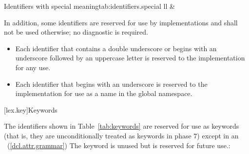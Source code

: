 \begin{floattable}{Identifiers with special meaning}{tab:identifiers.special}
{ll}
\topline
{}        &
           \\
\end{floattable}

\pnum
{}%
%
%
In addition, some identifiers are reserved for use by \Cpp
implementations and shall
not be used otherwise; no diagnostic is required.%
\begin{itemize}
\item
Each identifier that contains a double underscore
\tcode{\unun}
%
or begins with an underscore followed by
an uppercase letter
%
is reserved to the implementation for any use.
\item
Each identifier that begins with an underscore is
%
reserved to the implementation for use as a name in the global namespace.%
\end{itemize}

[lex.key]{Keywords}

\enlargethispage{\baselineskip}%
\pnum
{}%
The identifiers shown in Table~\ref{tab:keywords} are reserved for use
as keywords (that is, they are unconditionally treated as keywords in
phase 7) except in an ~(\ref{dcl.attr.grammar})
\enternote The  keyword is unused but is reserved for future use.\exitnote:

